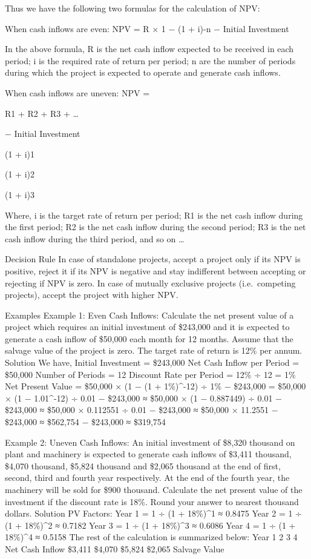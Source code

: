 \documentclass[]{book}
\theoremstyle{definition}
\theoremstyle{definition}
\theoremstyle{definition}
\theoremstyle{remark}
\begin{document}
Thus we have the following two formulas for the calculation of NPV:

When cash inflows are even: NPV = R × 1 − (1 + i)-n − Initial Investment

In the above formula, R is the net cash inflow expected to be received
in each period; i is the required rate of return per period; n are the
number of periods during which the project is expected to operate and
generate cash inflows.

When cash inflows are uneven: NPV =

R1 + R2 + R3 + \ldots{}

− Initial Investment

(1 + i)1

(1 + i)2

(1 + i)3

Where, i is the target rate of return per period; R1 is the net cash
inflow during the first period; R2 is the net cash inflow during the
second period; R3 is the net cash inflow during the third period, and so
on \ldots{}

Decision Rule In case of standalone projects, accept a project only if
its NPV is positive, reject it if its NPV is negative and stay
indifferent between accepting or rejecting if NPV is zero. In case of
mutually exclusive projects (i.e.~competing projects), accept the
project with higher NPV.

Examples Example 1: Even Cash Inflows: Calculate the net present value
of a project which requires an initial investment of \$243,000 and it is
expected to generate a cash inflow of \$50,000 each month for 12 months.
Assume that the salvage value of the project is zero. The target rate of
return is 12\% per annum. Solution We have, Initial Investment =
\$243,000 Net Cash Inflow per Period = \$50,000 Number of Periods = 12
Discount Rate per Period = 12\% ÷ 12 = 1\% Net Present Value = \$50,000
× (1 − (1 + 1\%)\^{}-12) ÷ 1\% − \$243,000 = \$50,000 × (1 −
1.01\^{}-12) ÷ 0.01 − \$243,000 ≈ \$50,000 × (1 − 0.887449) ÷ 0.01 −
\$243,000 ≈ \$50,000 × 0.112551 ÷ 0.01 − \$243,000 ≈ \$50,000 × 11.2551
− \$243,000 ≈ \$562,754 − \$243,000 ≈ \$319,754

Example 2: Uneven Cash Inflows: An initial investment of \$8,320
thousand on plant and machinery is expected to generate cash inflows of
\$3,411 thousand, \$4,070 thousand, \$5,824 thousand and \$2,065
thousand at the end of first, second, third and fourth year
respectively. At the end of the fourth year, the machinery will be sold
for \$900 thousand. Calculate the net present value of the investment if
the discount rate is 18\%. Round your answer to nearest thousand
dollars. Solution PV Factors: Year 1 = 1 ÷ (1 + 18\%)\^{}1 ≈ 0.8475 Year
2 = 1 ÷ (1 + 18\%)\^{}2 ≈ 0.7182 Year 3 = 1 ÷ (1 + 18\%)\^{}3 ≈ 0.6086
Year 4 = 1 ÷ (1 + 18\%)\^{}4 ≈ 0.5158 The rest of the calculation is
summarized below: Year 1 2 3 4 Net Cash Inflow \$3,411 \$4,070 \$5,824
\$2,065 Salvage Value
\end{document}
